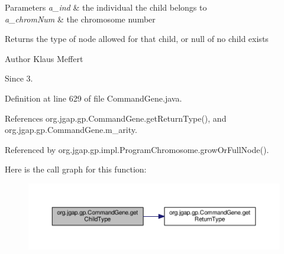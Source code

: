 \begin{DoxyParams}{Parameters}
{\em a\-\_\-ind} & the individual the child belongs to \\
\hline
{\em a\-\_\-chrom\-Num} & the chromosome number \\
\hline
\end{DoxyParams}
\begin{DoxyReturn}{Returns}
the type of node allowed for that child, or null of no child exists
\end{DoxyReturn}
\begin{DoxyAuthor}{Author}
Klaus Meffert 
\end{DoxyAuthor}
\begin{DoxySince}{Since}
3. 
\end{DoxySince}


Definition at line 629 of file Command\-Gene.\-java.



References org.\-jgap.\-gp.\-Command\-Gene.\-get\-Return\-Type(), and org.\-jgap.\-gp.\-Command\-Gene.\-m\-\_\-arity.



Referenced by org.\-jgap.\-gp.\-impl.\-Program\-Chromosome.\-grow\-Or\-Full\-Node().



Here is the call graph for this function\-:
\nopagebreak
\begin{figure}[H]
\begin{center}
\leavevmode
\includegraphics[width=350pt]{classorg_1_1jgap_1_1gp_1_1_command_gene_a764c86ce05fec22c79f4092ecd6a2269_cgraph}
\end{center}
\end{figure}


